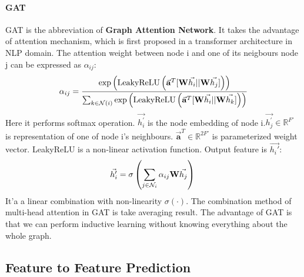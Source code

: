 \documentclass[sigconf]{acmart}
\begin{document}
\paragraph{GAT} GAT is the abbreviation of \textbf{Graph Attention Network}\cite{velivckovic2017graph}. It takes the advantage of attention mechanism, which is first proposed in a transformer architecture in NLP domain. The attention weight between node i and one of its neigbours node j can be expressed as $\alpha_{ij}$: 
\begin{equation}
\setlength\abovedisplayskip{5pt}%
\setlength\belowdisplayskip{5pt}
\alpha_{ij} = \frac{\textup{exp}\left(\textup{LeakyReLU}\left(\vec{\mathbf{a}}^{T}[\mathbf{W}\vec{h_{i}}||\mathbf{W}\vec{h_{j}}]\right)\right)}{\sum_{k \in \mathcal N\left(i\right)}\textup{exp}\left(\textup{LeakyReLU}\left(\vec{\mathbf{a}}^{T}[\mathbf{W}\vec{ h_{i}}||\mathbf{W} \vec{h_{k}}]\right)\right)}\\
\end{equation}
Here it performs softmax operation. $\vec{h_{i}^{'}}$ is the node embedding of node i.$\vec{h_{j}^{'}} \in \mathbb{R}^{F'}$
is representation of one of node i's neighbours. $\vec{\mathbf{a}}^{T} \in \mathbb{R}^{2F'}$ is parameterized weight vector. LeakyReLU is a non-linear activation function. Output feature is $\vec{h_{i}'}$:
\begin{equation}
\setlength\abovedisplayskip{5pt}%
\setlength\belowdisplayskip{5pt}
\vec{h_{i}'} = \sigma\left(\sum_{j \in \mathcal N_{i}}\alpha_{ij}\mathbf{W}\vec{h_{j}}\right)\\
\end{equation}
It'a a linear combination with non-linearity $\sigma(\cdot)$. The combination method of multi-head attention in GAT is take averaging result. The advantage of GAT is that we can perform inductive learning without knowing everything about the whole graph.

\subsection{Feature to Feature Prediction}
\end{document}
